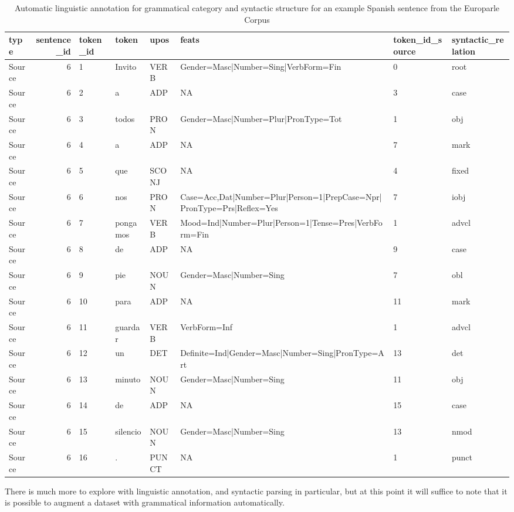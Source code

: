 \documentclass[
]{article}
\begin{document}
\begin{table}

\caption{\label{tab:generation-europarle-es-example}Automatic linguistic annotation for grammatical category and syntactic structure for an example Spanish sentence from the Europarle Corpus}
\centering
\begin{tabular}[t]{lrllllll}
\toprule
type & sentence\_id & token\_id & token & upos & feats & token\_id\_source & syntactic\_relation\\
\midrule
Source & 6 & 1 & Invito & VERB & Gender=Masc|Number=Sing|VerbForm=Fin & 0 & root\\
Source & 6 & 2 & a & ADP & NA & 3 & case\\
Source & 6 & 3 & todos & PRON & Gender=Masc|Number=Plur|PronType=Tot & 1 & obj\\
Source & 6 & 4 & a & ADP & NA & 7 & mark\\
Source & 6 & 5 & que & SCONJ & NA & 4 & fixed\\
\addlinespace
Source & 6 & 6 & nos & PRON & Case=Acc,Dat|Number=Plur|Person=1|PrepCase=Npr|PronType=Prs|Reflex=Yes & 7 & iobj\\
Source & 6 & 7 & pongamos & VERB & Mood=Ind|Number=Plur|Person=1|Tense=Pres|VerbForm=Fin & 1 & advcl\\
Source & 6 & 8 & de & ADP & NA & 9 & case\\
Source & 6 & 9 & pie & NOUN & Gender=Masc|Number=Sing & 7 & obl\\
Source & 6 & 10 & para & ADP & NA & 11 & mark\\
\addlinespace
Source & 6 & 11 & guardar & VERB & VerbForm=Inf & 1 & advcl\\
Source & 6 & 12 & un & DET & Definite=Ind|Gender=Masc|Number=Sing|PronType=Art & 13 & det\\
Source & 6 & 13 & minuto & NOUN & Gender=Masc|Number=Sing & 11 & obj\\
Source & 6 & 14 & de & ADP & NA & 15 & case\\
Source & 6 & 15 & silencio & NOUN & Gender=Masc|Number=Sing & 13 & nmod\\
\addlinespace
Source & 6 & 16 & . & PUNCT & NA & 1 & punct\\
\bottomrule
\end{tabular}
\end{table}

There is much more to explore with linguistic annotation, and syntactic parsing in particular, but at this point it will suffice to note that it is possible to augment a dataset with grammatical information automatically.
\end{document}
